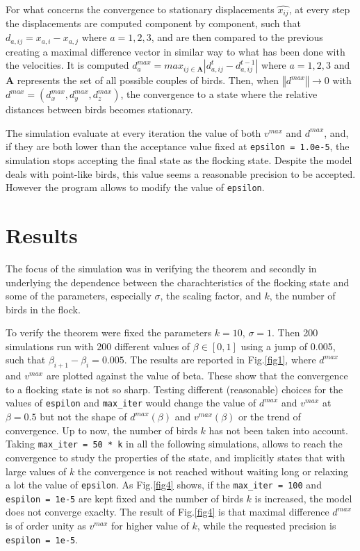 \documentclass{article} %
\newcounter{math}
\begin{document}
For what concerns the convergence to stationary displacements $\widehat{x_{ij}}$, at every 
step the displacements are computed component by component, such that 
$d_{a,ij}=x_{a,i}-x_{a,j}$ where $a=1,2,3$, and are then compared to the previous creating
a maximal difference vector in similar way to what has been done with the velocities.
It is computed $d_a^{max} = max_{ij\in\mathbf{A}}|d_{a,ij}^{t} - d_{a,ij}^{t-1}|$
where $a=1,2,3$ and $\mathbf{A}$ represents the set of all possible couples of birds.
Then, when $\left\Vert d^{max}\right\Vert \rightarrow 0$ with
$d^{max} = (d_x^{max},d_y^{max},d_z^{max})$, the convergence to a state where the relative
distances between birds becomes stationary.

The simulation evaluate at every iteration the value of both $v^{max}$ and $d^{max}$, and, 
if they are both lower than the acceptance value fixed at \verb|epsilon = 1.0e-5|, the simulation stops 
accepting the final state as the flocking state. Despite the model deals with point-like birds, 
this value seems a reasonable precision to be accepted.
However the program allows to modify the value of \verb|epsilon|.

\section {Results}
The focus of the simulation was in verifying the theorem and secondly
in underlying the dependence between the charachteristics of the flocking state
and some of the parameters, especially $\sigma$, the scaling factor, and $k$, the number of
birds in the flock.

To verify the theorem were fixed the parameters $k=10$, $\sigma=1$. Then 200 simulations run with 
200 different values of $\beta\in[0,1]$ using a jump of 0.005, such that $\beta_{i+1}-\beta_i=0.005$.
The results are reported in Fig.\ref{fig1}, where $d^{max}$ and $v^{max}$ are plotted against the value
of beta. These show that the convergence to a flocking state is not so sharp. Testing different (reasonable) 
choices for the values of \verb|espilon| and \verb|max_iter| would change the value of $d^{max}$ and $v^{max}$
at $\beta=0.5$ but not the shape of $d^{max}(\beta)$ and $v^{max}(\beta)$  or the trend of convergence.
Up to now, the number of birds $k$ has not been taken into account. Taking \verb|max_iter = 50 * k| in 
all the following simulations, allows to reach the convergence to study the properties of the state, and 
implicitly states that with large values of $k$ the convergence is not reached without waiting long or 
relaxing a lot the value of \verb|epsilon|.
As Fig.\ref{fig4} shows, if the \verb|max_iter = 100| and \verb|espilon = 1e-5| are kept fixed and 
the number of birds $k$ is increased, the model does not converge exaclty. The result of Fig.\ref{fig4} is that
maximal difference $d^{max}$ is of order unity as $v^{max}$ for higher value of $k$, while the requested precision
is \verb|espilon = 1e-5|.
\end{document}
